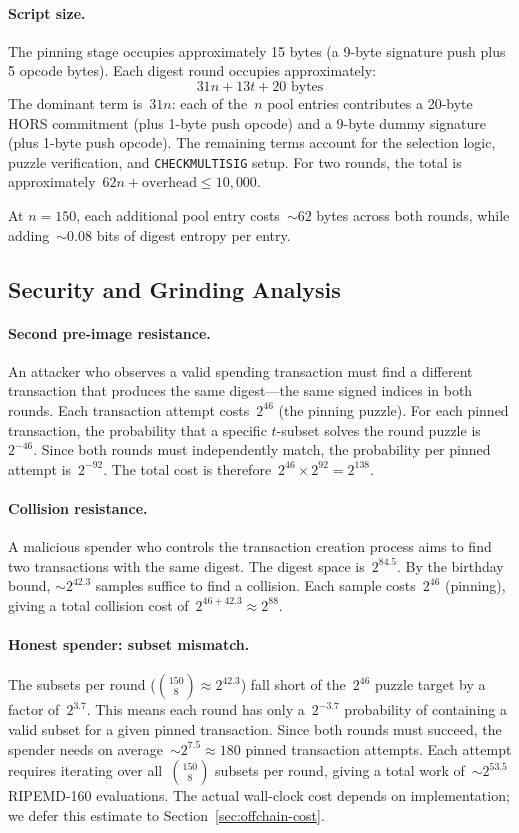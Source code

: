 \documentclass[11pt, a4paper]{article}
\begin{document}
\paragraph{Script size.}
The pinning stage occupies approximately 15 bytes (a 9-byte signature push plus 5 opcode bytes). Each digest round occupies approximately:
$$31n + 13 t + 20 \text{ bytes}$$
The dominant term is~$31n$: each of the~$n$ pool entries contributes a 20-byte HORS commitment (plus 1-byte push opcode) and a 9-byte dummy signature (plus 1-byte push opcode). The remaining terms account for the selection logic, puzzle verification, and \texttt{CHECKMULTISIG} setup. For two rounds, the total is approximately~$62n + \text{overhead} \leq 10{,}000$.

At $n = 150$, each additional pool entry costs~${\sim}62$ bytes across both rounds, while adding~${\sim}0.08$ bits of digest entropy per entry.

\subsection{Security and Grinding Analysis}
\label{sec:security-detail}

\paragraph{Second pre-image resistance.}
An attacker who observes a valid spending transaction must find a different transaction that produces the same digest---the same signed indices in both rounds. Each transaction attempt costs~$2^{46}$ (the pinning puzzle). For each pinned transaction, the probability that a specific $t$-subset solves the round puzzle is~$2^{-46}$. Since both rounds must independently match, the probability per pinned attempt is~$2^{-92}$. The total cost is therefore~$2^{46} \times 2^{92} = 2^{138}$.

\paragraph{Collision resistance.}
A malicious spender who controls the transaction creation process aims to find two transactions with the same digest. The digest space is~$2^{84.5}$. By the birthday bound, ${\sim}2^{42.3}$ samples suffice to find a collision. Each sample costs~$2^{46}$ (pinning), giving a total collision cost of~$2^{46 + 42.3} \approx 2^{88}$.

\paragraph{Honest spender: subset mismatch.}
The subsets per round ($\binom{150}{8} \approx 2^{42.3}$) fall short of the~$2^{46}$ puzzle target by a factor of~$2^{3.7}$. This means each round has only a~$2^{-3.7}$ probability of containing a valid subset for a given pinned transaction. Since both rounds must succeed, the spender needs on average~${\sim}2^{7.5} \approx 180$ pinned transaction attempts. Each attempt requires iterating over all~$\binom{150}{8}$ subsets per round, giving a total work of~${\sim}2^{53.5}$ RIPEMD-160 evaluations. The actual wall-clock cost depends on implementation; we defer this estimate to Section~\ref{sec:offchain-cost}.
\end{document}
